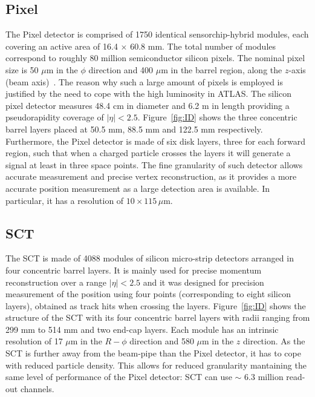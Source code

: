 			\subsection*{Pixel}
				
				The Pixel detector is comprised of 1750 identical sensorchip-hybrid modules, each covering an active area of 16.4 $\times$ 60.8 mm. The total number of modules correspond to roughly 80 million semiconductor silicon pixels. The nominal pixel size is 50 $\mu$m in the $\phi$ direction and 400 $\mu$m in the barrel region, along the $z$-axis (beam axis)~\cite{ATLASPix}. The reason why such a large amount of pixels is employed is justified by the need to cope with the high luminosity in \ac{ATLAS}. The silicon pixel detector measures 48.4 cm in diameter and 6.2 m in length providing a pseudorapidity coverage of $\left|\eta\right| < 2.5$. Figure~\ref{fig:ID} shows the three concentric barrel layers placed at 50.5 mm, 88.5 mm and 122.5 mm respectively. Furthermore, the Pixel detector is made of six disk layers, three for each forward region, such that when a charged particle crosses the layers it will generate a signal at least in three space points. The fine granularity of such detector allows accurate measurement and precise vertex reconstruction, as it provides a more accurate position measurement as a large detection area is available. In particular, it has a resolution of $10 \times 115\,\mu$m.

			\subsection*{SCT}

				The \ac{SCT} is made of 4088 modules of silicon micro-strip detectors arranged in four concentric barrel layers. It is mainly used for precise momentum reconstruction over a range $\left|\eta\right| < 2.5$ and it was designed for precision measurement of the position using four points (corresponding to eight silicon layers), obtained as track hits when crossing the layers. Figure~\ref{fig:ID} shows the structure of the \ac{SCT} with its four concentric barrel layers with radii ranging from 299 mm to 514 mm and two end-cap layers. Each module has an intrinsic resolution of 17 $\mu$m in the $R-\phi$ direction and 580 $\mu$m in the $z$ direction. As the \ac{SCT} is further away from the beam-pipe than the Pixel detector, it has to cope with reduced particle density. This allows for reduced granularity mantaining the same level of performance of the Pixel detector: \ac{SCT} can use $\sim$ 6.3 million read-out channels.%



